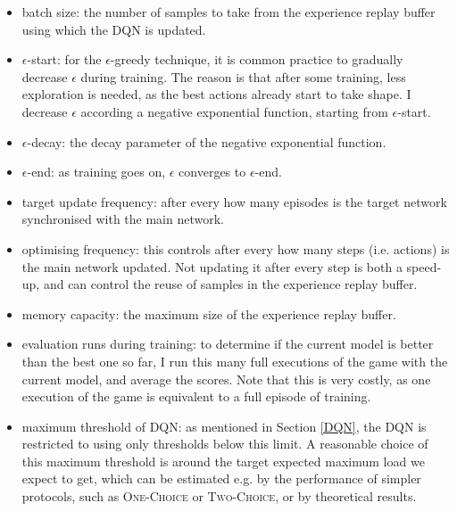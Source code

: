 \begin{itemize} 
    \item batch size: the number of samples to take from the experience replay buffer using which the DQN is updated.
    
    \item $\epsilon$-start: for the $\epsilon$-greedy technique, it is common practice to gradually decrease $\epsilon$ during training. The reason is that after some training, less exploration is needed, as the best actions already start to take shape. I decrease $\epsilon$ according a negative exponential function, starting from $\epsilon$-start.
    
    \item $\epsilon$-decay: the decay parameter of the negative exponential function.
    
    \item $\epsilon$-end: as training goes on, $\epsilon$ converges to $\epsilon$-end.
     
    
    \item target update frequency: after every how many episodes is the target network synchronised with the main network.
    
    \item optimising frequency: this controls after every how many steps (i.e. actions) is the main network updated. Not updating it after every step is both a speed-up, and can control the reuse of samples in the experience replay buffer.
    
    \item memory capacity: the maximum size of the experience replay buffer.
    
    \item evaluation runs during training: to determine if the current model is better than the best one so far, I run this many full executions of the game with the current model, and average the scores. Note that this is very costly, as one execution of the game is equivalent to a full episode of training.
    
    \item maximum threshold of DQN: as mentioned in Section \ref{DQN}, the DQN is restricted to using only thresholds below this limit. A reasonable choice of this maximum threshold is around the target expected maximum load we expect to get, which can be estimated e.g. by the performance of simpler protocols, such as \textsc{One-Choice} or \textsc{Two-Choice}, or by theoretical results.
    

\end{itemize}
